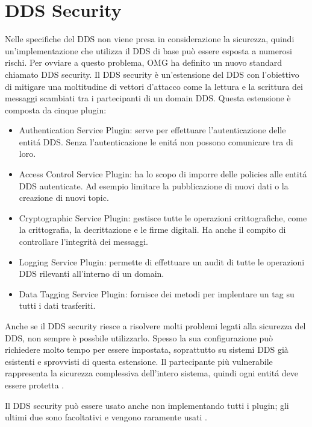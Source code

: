 \section{DDS Security}
Nelle specifiche del DDS non viene presa in considerazione la sicurezza, quindi
un'implementazione che utilizza il DDS di base può essere esposta a numerosi 
rischi. Per ovviare a questo problema, OMG ha definito un nuovo standard 
chiamato DDS security. Il DDS security è un'estensione del DDS con 
l'obiettivo di mitigare una moltitudine di vettori d'attacco come 
la lettura e la scrittura dei messaggi scambiati tra i partecipanti di un 
domain DDS. Questa estensione è composta da cinque plugin:
\begin{itemize}
    \item Authentication Service Plugin: serve per effettuare l'autenticazione 
    delle entitá DDS. Senza l'autenticazione le enitá non possono
    comunicare tra di loro.
    \item Access Control Service Plugin: ha lo scopo di imporre 
    delle policies alle entitá DDS autenticate. Ad esempio limitare
    la pubblicazione di nuovi dati o la creazione di nuovi topic.
    \item Cryptographic Service Plugin: gestisce tutte le operazioni 
    crittografiche, come la crittografia, la decrittazione e
    le firme digitali. Ha anche il compito di controllare l'integrità
    dei messaggi.
    \item Logging Service Plugin: permette di effettuare un audit di 
    tutte le operazioni DDS rilevanti all'interno di un domain.
    \item Data Tagging Service Plugin: fornisce dei metodi per implentare
    un tag su tutti i dati trasferiti. 
\end{itemize}
Anche se il DDS security riesce a risolvere molti problemi legati alla
sicurezza del DDS, non sempre è possbile utilizzarlo. Spesso 
la sua configurazione può richiedere molto tempo per essere 
impostata, soprattutto su sistemi DDS già esistenti e sprovvisti di 
questa estensione.
Il partecipante più vulnerabile rappresenta la sicurezza
complessiva dell'intero sistema, quindi ogni entitá deve essere
protetta \cite{Michaud2017Apr}. 

Il DDS security può essere usato anche non implementando tutti i plugin;
gli ultimi due sono facoltativi e vengono 
raramente usati \cite{essay93639}. 
\label{DDS Security}


